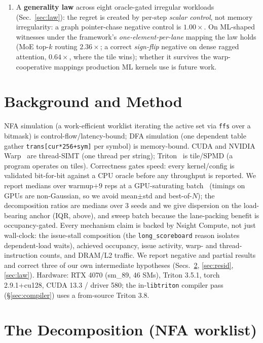 \documentclass[sigplan,10pt]{acmart}
\begin{document}
\begin{enumerate}
lowering is an existence proof ($4.2\times$, via \texttt{nvcc}).
\item A \textbf{generality law} across eight oracle-gated irregular workloads (Sec.~\ref{sec:law}):
the regret is created by per-step \emph{scalar control}, not memory irregularity: a graph pointer-chase
negative control is $1.00\times$. On ML-shaped witnesses under the framework's \emph{one-element-per-lane}
mapping the law holds (MoE top-$k$ routing $2.36\times$; a correct \emph{sign-flip} negative on dense
ragged attention, $0.64\times$, where the tile wins); whether it survives the warp-cooperative mappings
production ML kernels use is future work.
\end{enumerate}

\section{Background and Method}
NFA simulation (a work-efficient worklist iterating the active set via \texttt{ffs} over a bitmask) is
control-flow/latency-bound; DFA simulation (one dependent table gather \texttt{trans[cur*256+sym]} per
symbol) is memory-bound. CUDA and NVIDIA Warp~\cite{warp2022} are thread-SIMT (one thread per string);
Triton~\cite{triton2019} is tile/SPMD (a program operates on tiles). Correctness gates speed: every
kernel/config is validated bit-for-bit against a CPU oracle before any throughput is reported. We
report medians over warmup${+}9$ reps at a GPU-saturating batch~\cite{hoefler2015} (timings on GPUs
are non-Gaussian, so we avoid mean$\pm$std and best-of-$N$); the decomposition ratios are medians over 3
seeds and we give dispersion on the load-bearing anchor (IQR, above), and sweep batch because the lane-packing
benefit is occupancy-gated. Every mechanism claim is backed by Nsight Compute, not just wall-clock:
the issue-stall composition (the \texttt{long\_scoreboard} reason isolates dependent-load waits),
achieved occupancy, issue activity, warp- and thread-instruction counts, and DRAM/L2 traffic. We report negative and partial results and correct
three of our own intermediate hypotheses (Secs.~\ref{sec:decomp}, \ref{sec:resid}, \ref{sec:law}).
Hardware: RTX 4070 (sm\_89, 46 SMs), Triton 3.5.1, torch 2.9.1+cu128, CUDA 13.3 / driver 580; the
in-\texttt{libtriton} compiler pass (\S\ref{sec:compiler}) uses a from-source Triton 3.8.

\section{The Decomposition (NFA worklist)}\label{sec:decomp}
\end{document}
